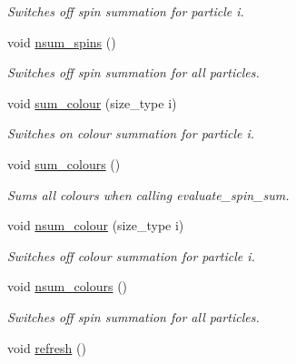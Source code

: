 \begin{DoxyCompactItemize}
\begin{DoxyCompactList}\small\item\em Switches off spin summation for particle i. \end{DoxyCompactList}\item 
\hypertarget{a00070_ac0e8919e83584a1e88fc07dc9d7263e3}{void \hyperlink{a00070_ac0e8919e83584a1e88fc07dc9d7263e3}{nsum\-\_\-spins} ()}\label{a00070_ac0e8919e83584a1e88fc07dc9d7263e3}

\begin{DoxyCompactList}\small\item\em Switches off spin summation for all particles. \end{DoxyCompactList}\item 
\hypertarget{a00070_a72f1698fd071be001fd331ac711f4e91}{void \hyperlink{a00070_a72f1698fd071be001fd331ac711f4e91}{sum\-\_\-colour} (size\-\_\-type i)}\label{a00070_a72f1698fd071be001fd331ac711f4e91}

\begin{DoxyCompactList}\small\item\em Switches on colour summation for particle i. \end{DoxyCompactList}\item 
\hypertarget{a00070_a132587c9138299ae7e2e96de48f0a076}{void \hyperlink{a00070_a132587c9138299ae7e2e96de48f0a076}{sum\-\_\-colours} ()}\label{a00070_a132587c9138299ae7e2e96de48f0a076}

\begin{DoxyCompactList}\small\item\em Sums all colours when calling evaluate\-\_\-spin\-\_\-sum. \end{DoxyCompactList}\item 
\hypertarget{a00070_a2a8a95f34f451622a28db3e5a522c697}{void \hyperlink{a00070_a2a8a95f34f451622a28db3e5a522c697}{nsum\-\_\-colour} (size\-\_\-type i)}\label{a00070_a2a8a95f34f451622a28db3e5a522c697}

\begin{DoxyCompactList}\small\item\em Switches off colour summation for particle i. \end{DoxyCompactList}\item 
\hypertarget{a00070_ab3fa6bcf41d7bfec126d24fea99357bf}{void \hyperlink{a00070_ab3fa6bcf41d7bfec126d24fea99357bf}{nsum\-\_\-colours} ()}\label{a00070_ab3fa6bcf41d7bfec126d24fea99357bf}

\begin{DoxyCompactList}\small\item\em Switches off spin summation for all particles. \end{DoxyCompactList}\item 
\hypertarget{a00070_a2a3aa7bc8efed3d4393e50c3dff4aee3}{void \hyperlink{a00070_a2a3aa7bc8efed3d4393e50c3dff4aee3}{refresh} ()}\label{a00070_a2a3aa7bc8efed3d4393e50c3dff4aee3}


\end{DoxyCompactItemize}
